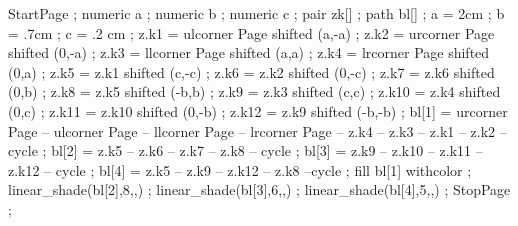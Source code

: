 \Slidetitle{%
\page\setupheadertexts[{\framed[frame=off,background=color,backgroundcolor=c,height=1.2cm,offset=3pt,top=\vss,bottom=\vss]{\switchtobodyfont[\Titlesize]\color[d]{#1}}}]\setupheader[state=start]}

\setupbottomtexts[{\framed[frame=off,background=color,backgroundcolor=c,height=1.2cm,offset=3pt,top=\vss,bottom=\vss]{\color[d]{\pagenumber}}}]

\setupbottom[state=start]





StartPage ;
numeric a ;
numeric b ;
numeric c ;
pair zk[] ;
path bl[] ;
a = 2cm ;
b = .7cm ;
c = .2 cm ;
z.k1 = ulcorner Page shifted (a,-a) ;
z.k2 = urcorner Page shifted (0,-a) ;
z.k3 = llcorner Page shifted (a,a) ;
z.k4 = lrcorner Page shifted (0,a) ;
z.k5 = z.k1 shifted (c,-c) ;
z.k6 = z.k2 shifted (0,-c) ;
z.k7 = z.k6 shifted (0,b) ;
z.k8 = z.k5 shifted (-b,b) ;
z.k9 = z.k3 shifted (c,c) ;
z.k10 = z.k4 shifted (0,c) ;
z.k11 = z.k10 shifted (0,-b) ;
z.k12 = z.k9 shifted (-b,-b) ;
bl[1] = urcorner Page -- ulcorner Page -- llcorner Page -- lrcorner Page -- z.k4 -- z.k3 -- z.k1 -- z.k2 -- cycle ;
bl[2] = z.k5 -- z.k6 -- z.k7 -- z.k8 -- cycle ;
bl[3] = z.k9 -- z.k10 -- z.k11 -- z.k12 -- cycle ;
bl[4] = z.k5 -- z.k9 -- z.k12 -- z.k8 --cycle ;
fill bl[1] withcolor  ;
linear_shade(bl[2],8,,) ;
linear_shade(bl[3],6,,) ;
linear_shade(bl[4],5,,) ;
StopPage ;
\stopuniqueMPgraphic



